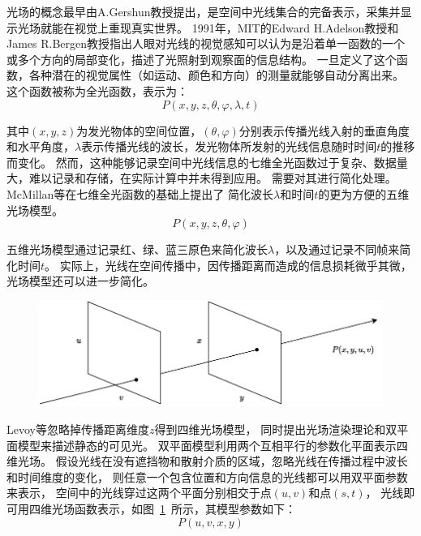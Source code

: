 光场的概念最早由A.Gershun教授提出，是空间中光线集合的完备表示，采集并显示光场就能在视觉上重现真实世界。
1991年，MIT的Edward H.Adelson教授和James R.Bergen教授指出人眼对光线的视觉感知可以认为是沿着单一函数的一个或多个方向的局部变化，描述了光照射到观察面的信息结构。
一旦定义了这个函数，各种潜在的视觉属性（如运动、颜色和方向）的测量就能够自动分离出来。
这个函数被称为全光函数，表示为：
\begin{equation}
	P(x,y,z,\theta,\varphi,\lambda,t)
\end{equation}\par
其中$(x,y,z)$为发光物体的空间位置，$(\theta,\varphi)$分别表示传播光线入射的垂直角度和水平角度，$\lambda$表示传播光线的波长，发光物体所发射的光线信息随时时间$t$的推移而变化。
然而，这种能够记录空间中光线信息的七维全光函数过于复杂、数据量大，难以记录和存储，在实际计算中并未得到应用。
需要对其进行简化处理。
McMillan等在七维全光函数的基础上提出了
简化波长$\lambda$和时间$t$的更为方便的五维光场模型。
\begin{equation}
	P(x,y,z,\theta,\varphi)
\end{equation}\par
五维光场模型通过记录红、绿、蓝三原色来简化波长$\lambda$，以及通过记录不同帧来简化时间$t$。
实际上，光线在空间传播中，因传播距离而造成的信息损耗微乎其微，光场模型还可以进一步简化。
%
%
%
%
\begin{figure}[!ht]
	\centering
	\includegraphics[width=0.95\linewidth]{figures/chapter2/double_plane_model.drawio}
	\label{chapter2_fig1:double_plane}
\end{figure}
%
%
%
%
Levoy等忽略掉传播距离维度$z$得到四维光场模型，
同时提出光场渲染理论和双平面模型来描述静态的可见光。
双平面模型利用两个互相平行的参数化平面表示四维光场。
假设光线在没有遮挡物和散射介质的区域，忽略光线在传播过程中波长和时间维度的变化，
则任意一个包含位置和方向信息的光线都可以用双平面参数来表示，
空间中的光线穿过这两个平面分别相交于点$(u, v)$和点$(s, t)$，
光线即可用四维光场函数表示，如图~\ref{chapter2_fig1:double_plane}~所示，其模型参数如下：
\begin{equation}
	P(u, v, x, y)
\end{equation}





